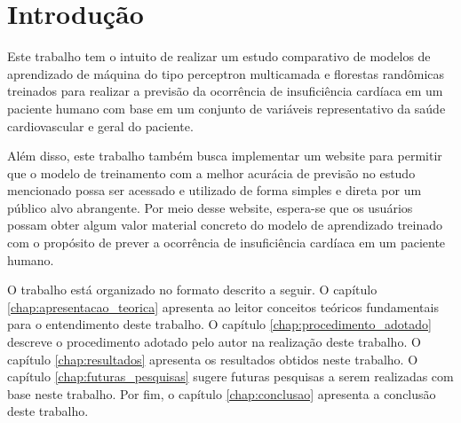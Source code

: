 \chapter{Introdução} \label{chap:introducao}

Este trabalho tem o intuito de realizar um estudo comparativo de modelos de aprendizado de máquina do tipo perceptron multicamada e florestas randômicas treinados para realizar a previsão da ocorrência de insuficiência cardíaca em um paciente humano com base em um conjunto de variáveis representativo da saúde cardiovascular e geral do paciente.

Além disso, este trabalho também busca implementar um website para permitir que o modelo de treinamento com a melhor acurácia de previsão no estudo mencionado possa ser acessado e utilizado de forma simples e direta por um público alvo abrangente. Por meio desse website, espera-se que os usuários possam obter algum valor material concreto do modelo de aprendizado treinado com o propósito de prever a ocorrência de insuficiência cardíaca em um paciente humano.

O trabalho está organizado no formato descrito a seguir. O capítulo \ref{chap:apresentacao_teorica} apresenta ao leitor conceitos teóricos fundamentais para o entendimento deste trabalho. O capítulo \ref{chap:procedimento_adotado} descreve o procedimento adotado pelo autor na realização deste trabalho. O capítulo \ref{chap:resultados} apresenta os resultados obtidos neste trabalho. O capítulo \ref{chap:futuras_pesquisas} sugere futuras pesquisas a serem realizadas com base neste trabalho. Por fim, o capítulo \ref{chap:conclusao} apresenta a conclusão deste trabalho.
